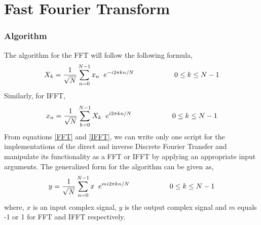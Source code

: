 \section{Fast Fourier Transform}

\subsubsection{Algorithm}
The algorithm for the FFT will follow the following formula,
\begin{equation}
X_k =\dfrac{1}{\sqrt{N}}\sum\limits_{n=0}^{N-1} x_n \hspace{2mm} e^{-i2\pi kn/N}		\hspace{2cm}	0\leq k \leq N-1
\label{FFT}
\end{equation}
Similarly, for IFFT,
\begin{equation}
x_n =\frac{1}{\sqrt{N}} \sum\limits_{k=0}^{N-1} X_k \hspace{2mm}  e^{i2\pi kn/N}		\hspace{2cm}	0\leq k \leq N-1
\label{IFFT}
\end{equation}
From equations \ref{FFT} and \ref{IFFT}, we can write only one script for the implementations of the direct and inverse Discrete Fourier Transfer and manipulate its functionality as a FFT or IFFT by applying an appropriate input arguments. The generalized form for the algorithm can be given as,
\begin{equation}
y =\frac{1}{\sqrt{N}} \sum\limits_{n=0}^{N-1} x \hspace{2mm}  e^{m  i2\pi kn/N}		\hspace{2cm}	0\leq k \leq N-1
\label{FT}
\end{equation}
where, $x$ is an input complex signal, $y$ is the output complex signal and $m$ equals -1 or 1 for FFT and IFFT respectively.

